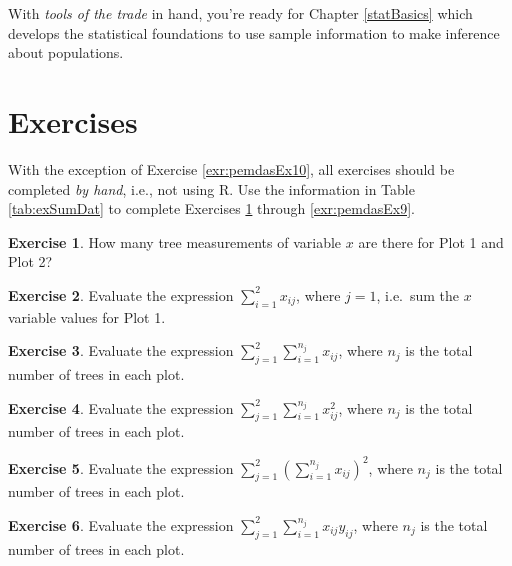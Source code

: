 \documentclass[
  11pt,
]{krantz}
\theoremstyle{definition}
\theoremstyle{definition}
\theoremstyle{definition}
\newtheorem{exercise}{Exercise}[chapter]
\theoremstyle{definition}
\theoremstyle{remark}
\begin{document}
With \emph{tools of the trade} in hand, you're ready for Chapter \ref{statBasics} which develops the statistical foundations to use sample information to make inference about populations.

\hypertarget{exercisesNotation}{%
\section{Exercises}\label{exercisesNotation}}

With the exception of Exercise \ref{exr:pemdasEx10}, all exercises should be completed \emph{by hand}, i.e., not using R. Use the information in Table \ref{tab:exSumDat} to complete Exercises \ref{exr:pemdasEx1} through \ref{exr:pemdasEx9}.

\begin{exercise}
\protect\hypertarget{exr:pemdasEx1}{}\label{exr:pemdasEx1}How many tree measurements of variable \(x\) are there for Plot 1 and Plot 2?
\end{exercise}

\begin{exercise}
\protect\hypertarget{exr:pemdasEx2}{}\label{exr:pemdasEx2}Evaluate the expression \(\sum^{2}_{i=1}x_{ij}\), where \(j=1\), i.e.~sum the \(x\) variable values for Plot 1.
\end{exercise}

\begin{exercise}
\protect\hypertarget{exr:pemdasEx3}{}\label{exr:pemdasEx3}Evaluate the expression \(\sum^2_{j=1}\sum^{n_j}_{i=1}x_{ij}\), where \(n_j\) is the total number of trees in each plot.
\end{exercise}

\begin{exercise}
\protect\hypertarget{exr:pemdasEx4}{}\label{exr:pemdasEx4}Evaluate the expression \(\sum^2_{j=1}\sum^{n_j}_{i=1}x_{ij}^2\), where \(n_j\) is the total number of trees in each plot.
\end{exercise}

\begin{exercise}
\protect\hypertarget{exr:pemdasEx5}{}\label{exr:pemdasEx5}Evaluate the expression \(\sum^2_{j=1}(\sum^{n_j}_{i=1}x_{ij})^2\), where \(n_j\) is the total number of trees in each plot.
\end{exercise}

\begin{exercise}
\protect\hypertarget{exr:pemdasEx6}{}\label{exr:pemdasEx6}Evaluate the expression \(\sum^2_{j=1}\sum^{n_j}_{i=1}x_{ij}y_{ij}\), where \(n_j\) is the total number of trees in each plot.
\end{exercise}
\end{document}
